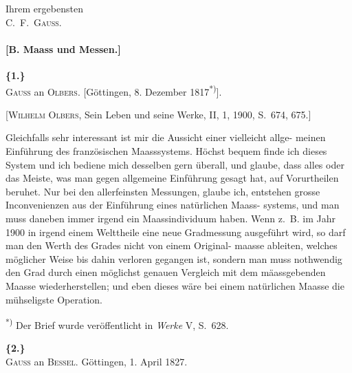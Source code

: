 \documentclass[12pt,a4paper]{article}
\theoremstyle{plain}
\theoremstyle{definition}
\theoremstyle{remark}
\begin{document}
\vspace{0.5cm}
\begin{flushright}
Ihrem ergebensten\\
\textsc{C.~F.~Gauss.}
\end{flushright}

\newpage


\paragraph*{[B. Maass und Messen.]}

\vspace{0.5cm}

\noindent\textbf{\{1.\}}\\
\textsc{Gauss} an \textsc{Olbers}. [G\"ottingen, 8. Dezember 1817\textsuperscript{*)}].

\vspace{0.2cm}
{\small[\textsc{Wilhelm Olbers}, Sein Leben und seine Werke, II, 1, 1900, S.~674, 675.]}

\vspace{0.3cm}

Gleichfalls sehr interessant ist mir die Aussicht einer vielleicht allge-
meinen Einf\"uhrung des franz\"osischen Maasssystems. H\"ochst bequem finde
ich dieses System und ich bediene mich desselben gern \"uberall, und glaube,
dass alles oder das Meiste, was man gegen allgemeine Einf\"uhrung gesagt hat,
auf Vorurtheilen beruhet. Nur bei den allerfeinsten Messungen, glaube ich,
entstehen grosse Inconvenienzen aus der Einf\"uhrung eines nat\"urlichen Maass-
systems, und man muss daneben immer irgend ein Maassindividuum haben.
Wenn z.~B. im Jahr 1900 in irgend einem Welttheile eine neue Gradmessung
ausgef\"uhrt wird, so darf man den Werth des Grades nicht von einem Original-
maasse ableiten, welches m\"oglicher Weise bis dahin verloren gegangen ist,
sondern man muss nothwendig den Grad durch einen m\"oglichst genauen
Vergleich mit dem m\"aassgebenden Maasse wiederherstellen; und eben dieses
w\"are bei einem nat\"urlichen Maasse die m\"uhseligste Operation.

\vspace{0.3cm}
{\small\textsuperscript{*)} Der Brief wurde ver\"offentlicht in \textit{Werke} V, S.~628.}

\vspace{0.5cm}

\noindent\textbf{\{2.\}}\\
\textsc{Gauss} an \textsc{Bessel}. G\"ottingen, 1. April 1827.
\end{document}
